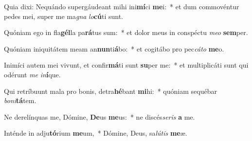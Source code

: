 \item Quia dixi: Nequándo supergáudeant mihi ini\textbf{mí}ci \textbf{me}i:~* et dum commovéntur pedes mei, super me ma\textit{gna} \textit{lo}\textbf{cú}ti sunt.
\item Quóniam ego in fla\textbf{gél}la pa\textbf{rá}tus sum:~* et dolor meus in conspéctu \textit{me}\textit{o} \textbf{sem}per.
\item Quóniam iniquitátem meam an\textbf{nun}ti\textbf{á}bo:~* et cogitábo pro pec\textit{cá}\textit{to} \textbf{me}o.
\item Inimíci autem mei vivunt, et confir\textbf{má}ti sunt \textbf{su}per me:~* et multiplicáti sunt qui odérunt \textit{me} \textit{in}\textbf{í}que.
\item Qui retríbuunt mala pro bonis, detra\textbf{hé}bant \textbf{mi}hi:~* quóniam sequébar \textit{bo}\textit{ni}\textbf{tá}tem.
\item Ne derelínquas me, Dómine, \textbf{De}us \textbf{me}us:~* ne discés\textit{se}\textit{ris} \textbf{a} me.
\item Inténde in adju\textbf{tó}rium \textbf{me}um,~* Dómine, Deus, sa\textit{lú}\textit{tis} \textbf{me}æ.
